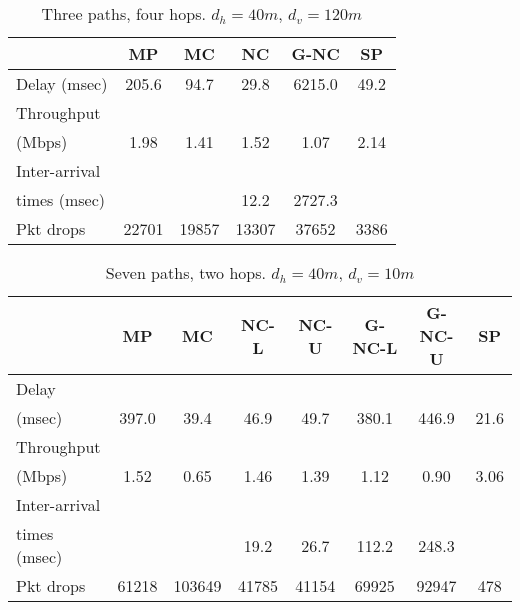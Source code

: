 \documentclass[journal, onecolumn, 12pt]{IEEEtran}
\begin{document}
\begin{table}[t]
\begin{center}
\scriptsize
\begin{tabular}{|l|c|c|c|c|c|}
\hline
~                                    & MP & MC & NC & G-NC & SP \\ \hline
Delay (msec)   & 205.6   & 94.7  & 29.8  & 6215.0 & 49.2  \\ \hline
Throughput                   & ~  & ~  & ~  & ~         & ~  \\
(Mbps)                   & 1.98  & 1.41  & 1.52 & 1.07 & 2.14 \\ \hline
Inter-arrival              & ~  & ~  & ~  & ~         & ~  \\
times (msec)   &   &   &  12.2 & 2727.3 & \\ \hline
Pkt drops  & 22701  & 19857  & 13307  & 37652 & 3386 \\ \hline
\end{tabular}
\end{center}
\caption {Three paths, four hops. $d_{h}=40m$, $d_{v}=120m$}
\label{tab:sim_topol_2}
\end{table}

\begin{table}
\begin{center}
\scriptsize
\begin{tabular}{|l|c|c|c|c|c|c|c|}
\hline
~                                   & MP & MC & NC-L & NC-U & G-NC-L & G-NC-U & SP \\ \hline
Delay           &   &   &  &  & & & \\
(msec)           & 397.0  & 39.4  & 46.9 &  49.7   &  380.1 &  446.9 & 21.6\\ \hline
Throughput             & ~  & ~  & ~    & ~    & ~           & ~           & ~  \\
(Mbps)                 & 1.52  & 0.65  &  1.46   &  1.39  & 1.12  & 0.90 & 3.06  \\ \hline
Inter-arrival             & ~  & ~  & ~    & ~    & ~           & ~           & ~  \\
times (msec)   &   &   &  19.2 & 26.7 &  112.2 &  248.3 &   \\ \hline
Pkt drops          & 61218  & 103649  & 41785 & 41154 & 69925 & 92947 & 478 \\ \hline

\end{tabular}
\end{center}
\caption {Seven paths, two hops. $d_{h}=40m$, $d_{v}=10m$}
\label{tab:sim_topol_3}
\end{table}
\end{document}
